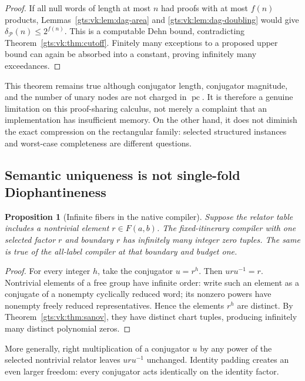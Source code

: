 \documentclass[11pt,letterpaper]{article}
\newtheorem{proposition}[theorem]{Proposition}
\theoremstyle{definition}
\theoremstyle{remark}
\newcommand{\Pp}{\mathcal P}
\newcommand{\F}{F(a,b)}
\newcommand{\pc}{\operatorname{pc}}
\begin{document}
\begin{proof}
If all null words of length at most $n$ had proofs with at most $f(n)$ products, Lemmas~\ref{gts:vk:lem:dag-area} and \ref{gts:vk:lem:dag-doubling} would give
$\delta_{\Pp}(n)\leq2^{f(n)}$.
This is a computable Dehn bound, contradicting Theorem~\ref{gts:vk:thm:cutoff}. Finitely many exceptions to a proposed upper bound can again be absorbed into a constant, proving infinitely many exceedances.
\end{proof}

This theorem remains true although conjugator length, conjugator magnitude, and the number of unary nodes are not charged in $\pc$. It is therefore a genuine limitation on this proof-sharing calculus, not merely a complaint that an implementation has insufficient memory. On the other hand, it does not diminish the exact compression on the rectangular family: selected structured instances and worst-case completeness are different questions.

\subsection{Semantic uniqueness is not single-fold Diophantineness}

\begin{proposition}[Infinite fibers in the native compiler]\label{gts:vk:prop:infinite-fibers}
Suppose the relator table includes a nontrivial element $r\in\F$. The fixed-itinerary compiler with one selected factor $r$ and boundary $r$ has infinitely many integer zero tuples. The same is true of the all-label compiler at that boundary and budget one.
\end{proposition}

\begin{proof}
For every integer $h$, take the conjugator $u=r^h$. Then $uru^{-1}=r$. Nontrivial elements of a free group have infinite order: write such an element as a conjugate of a nonempty cyclically reduced word; its nonzero powers have nonempty freely reduced representatives. Hence the elements $r^h$ are distinct. By Theorem~\ref{gts:vk:thm:sanov}, they have distinct chart tuples, producing infinitely many distinct polynomial zeros.
\end{proof}

More generally, right multiplication of a conjugator $u$ by any power of the selected nontrivial relator leaves $uru^{-1}$ unchanged. Identity padding creates an even larger freedom: every conjugator acts identically on the identity factor.
\end{document}
